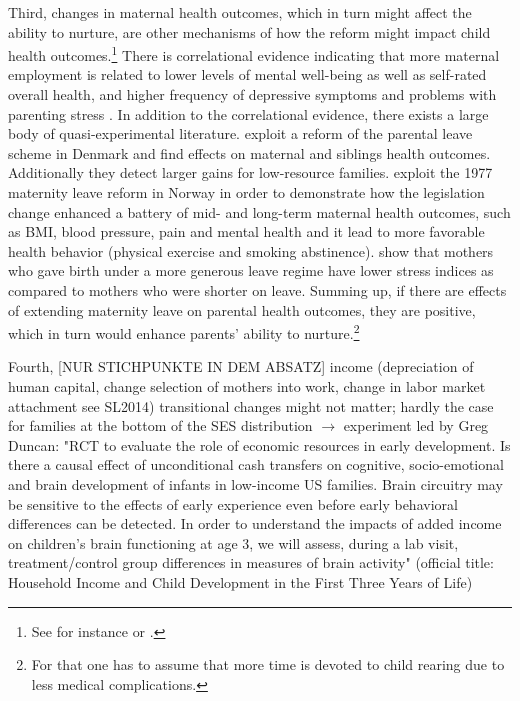 \documentclass[11pt, a4paper]{article} %
\begin{document}
Third, changes in maternal health outcomes, which in turn might affect the ability to nurture, are other mechanisms of how the reform might impact child health outcomes.\footnote{See for instance \cite{patel2004} or \cite{frech2011maternal}.} There is correlational evidence indicating that more maternal employment is related to lower levels of mental well-being as well as self-rated overall health, and higher frequency of depressive symptoms and problems with parenting stress \citep{chatterji2005does,Chatterji2013}. In addition to the correlational evidence, there exists a large body of quasi-experimental literature. \cite{beuchert2016} exploit a reform of the parental leave scheme in Denmark and find effects on maternal and siblings health outcomes. Additionally they detect larger gains for low-resource families. \cite{butikofer2018impact} exploit the 1977 maternity leave reform in Norway in order to demonstrate how the legislation change enhanced a battery of mid- and long-term maternal health outcomes, such as BMI, blood pressure, pain and mental health and it lead to more favorable health behavior (physical exercise and smoking abstinence). \cite{albagli2018} show that mothers who gave birth under a more generous leave regime have lower stress indices as compared to mothers who were shorter on leave. \newline 
Summing up, if there are effects of extending maternity leave on parental health outcomes, they are positive, which in turn would enhance parents' ability to nurture.\footnote{ For that one has to assume that more time is devoted to child rearing due to less medical complications.}\newline 



Fourth,  [NUR STICHPUNKTE IN DEM ABSATZ]
 income (depreciation of human capital, change selection of mothers into work, change in labor market attachment see SL2014)
transitional changes might not matter; hardly the case for families at the bottom of the SES distribution $\rightarrow$	 
experiment led by Greg Duncan: "RCT to evaluate the role of economic resources in early development. Is there a causal effect of unconditional cash transfers on cognitive, socio-emotional and brain development of infants in low-income US families. Brain circuitry may be sensitive to the effects of early experience even before early behavioral differences can be detected. In order to understand the impacts of added income on children's brain functioning at age 3, we will assess, during a lab visit, treatment/control group differences in measures of brain activity" (official title: Household Income and Child Development in the First Three Years of Life)
\end{document}
